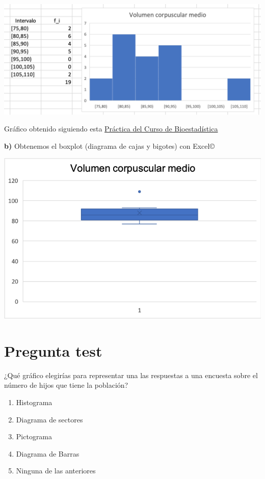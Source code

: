 \documentclass[
]{book}
\providecommand{\tightlist}{%
  \setlength{\itemsep}{0pt}\setlength{\parskip}{0pt}}
\begin{document}
\includegraphics[width=18.58in]{img/2_6}

Gráfico obtenido siguiendo esta \href{https://1fjmanzano.github.io/bioestadistica/histogramas.html\#histogramas-con-excel-pr\%C3\%A1cticas}{Práctica del Curso de Bioestadística}

\textbf{b)} Obtenemos el boxplot (diagrama de cajas y bigotes) con Excel©

\includegraphics[width=9.92in]{img/2_7}

\hypertarget{pregunta-test-60}{%
\section{Pregunta test}\label{pregunta-test-60}}

¿Qué gráfico elegirías para representar una las respuestas a una encuesta sobre el número de hijos que tiene la población?

\begin{enumerate}
\def\labelenumi{\alph{enumi})}
\tightlist
\item
  Histograma
\item
  Diagrama de sectores
\item
  Pictograma
\item
  Diagrama de Barras
\item
  Ninguna de las anteriores
\end{enumerate}
\end{document}

